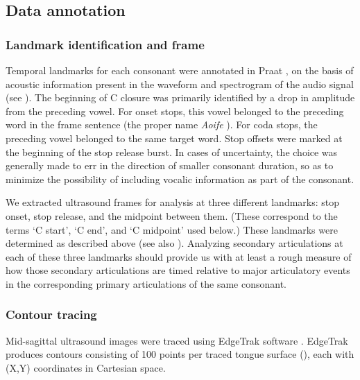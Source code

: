 \documentclass[output=paper,colorlinks,citecolor=brown]{langscibook}
\newcommand{\vel}{\ipa{ˠ}}
\begin{document}
\subsection{Data annotation}

\subsubsection{Landmark identification and frame}\label{sec:landmarks}
Temporal landmarks for each consonant were annotated in Praat \citep{Praat}, on the basis of acoustic information present in the waveform and spectrogram of the audio signal (see \citealt{Turk_etal2006_acoustic_prosody_research}). The beginning of C closure was primarily identified by a drop in amplitude from the preceding vowel. For onset stops, this vowel belonged to the preceding word in the frame sentence (the proper name \emph{Aoife} \ipa{[ˈiːf\vel ə]}). For coda stops, the preceding vowel belonged to the same target word. Stop offsets were marked at the beginning of the stop release burst. In cases of uncertainty, the choice was generally made to err in the direction of smaller consonant duration, so as to minimize the possibility of including vocalic information as part of the consonant.

We extracted ultrasound frames for analysis at three different landmarks: stop onset, stop release, and the midpoint between them. (These correspond to the terms `C start', `C end', and `C midpoint' used below.)
These landmarks were determined as described above (see also ). Analyzing secondary articulations at each of these three landmarks should provide us with at least a rough measure of how those secondary articulations are timed relative to major articulatory events in the corresponding primary articulations of the same consonant.


\subsubsection{Contour tracing}\label{sec:contours}
Mid-sagittal ultrasound images were traced using EdgeTrak software \citep{EdgeTrak_Li_etal2005}. EdgeTrak produces contours consisting of 100 points per traced tongue surface (), each with (X,Y) coordinates in Cartesian space.
\end{document}
